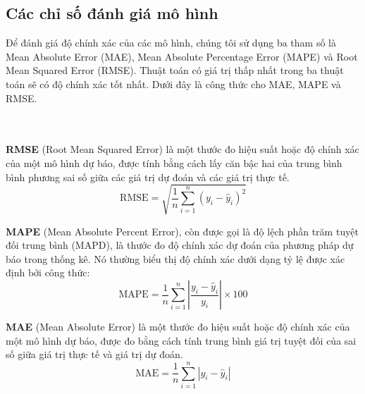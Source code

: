 \subsection{Các chỉ số đánh giá mô hình}
Để đánh giá độ chính xác của các mô hình, chúng tôi sử dụng ba tham số là Mean Absolute Error (MAE), Mean Absolute Percentage Error (MAPE) và Root Mean Squared Error (RMSE). Thuật toán có giá trị thấp nhất trong ba thuật toán sẽ có độ chính xác tốt nhất. Dưới đây là công thức cho MAE, MAPE và RMSE.
\\ \\ \\  %
\par
\textbf{RMSE} (Root Mean Squared Error) là một thước đo hiệu suất hoặc độ chính xác của một mô hình dự báo, được tính bằng cách lấy căn bậc hai của trung bình bình phương sai số giữa các giá trị dự đoán và các giá trị thực tế.
\[
\text{RMSE} = \sqrt{\frac{1}{n} \sum_{i=1}^{n} (y_i - \hat{y}_i)^2}
\]
\par
\textbf{MAPE}  (Mean Absolute Percent Error), còn được gọi là độ lệch phần trăm tuyệt đối trung bình (MAPD), là thước đo độ chính xác dự đoán của phương pháp dự báo trong thống kê. Nó thường biểu thị độ chính xác dưới dạng tỷ lệ được xác định bởi công thức:
\[
\text{MAPE} = \frac{1}{n} \sum_{i=1}^{n} \left| \frac{y_i - \hat{y}_i}{y_i} \right| \times 100
\]
\par
\textbf{MAE} (Mean Absolute Error) là một thước đo hiệu suất hoặc độ chính xác của một mô hình dự báo, được đo bằng cách tính trung bình giá trị tuyệt đối của sai số giữa giá trị thực tế và giá trị dự đoán.
\[
\text{MAE} = \frac{1}{n} \sum_{i=1}^{n} |y_i - \hat{y}_i|
\]
